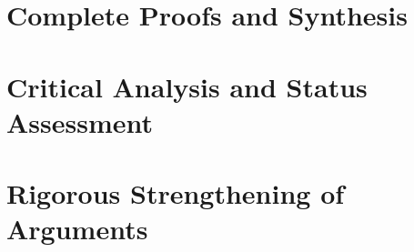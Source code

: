 \documentclass[11pt,a4paper]{report}
\begin{document}
\chapter{Complete Proofs and Synthesis}
\label{ch:synthesis}
















% 






\chapter{Critical Analysis and Status Assessment}
\label{ch:assessment}









\chapter{Rigorous Strengthening of Arguments}
\label{ch:fortification}








\end{document}
